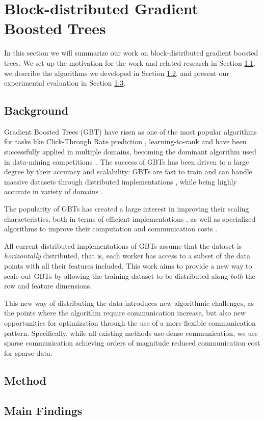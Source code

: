 \section{Block-distributed Gradient Boosted Trees}
\label{sec:block-gbt}

In this section we will summarize our work on block-distributed
gradient boosted trees. We set up the motivation for the work
and related research in Section \ref{sec:block-gbt-background}.
we describe the algorithms we developed in Section \ref{sec:block-gbt-method},
and present our experimental evaluation in Section \ref{sec:block-gbt-results}.

\subsection{Background}
\label{sec:block-gbt-background}

Gradient Boosted Trees (GBT) have risen as one of the most popular algorithms for
tasks like Click-Through Rate prediction \cite{ctr-facebook}, learning-to-rank \cite{mcrank} and have been
successfully applied in multiple domains, becoming the dominant
algorithm used in data-mining competitions~\cite{xgboost}.
The success of GBTs has been driven to a large degree by their
accuracy and scalability: GBTs are fast to train and can handle massive datasets
through distributed implementations \cite{xgboost, lightgbm}, while being
highly accurate in variety of domains \cite{xgboost, hundreds-classifiers}.

The popularity of GBTs has created a large interest
in improving their scaling characteristics,
both in terms of efficient implementations \cite{xgboost, lightgbm, dimboost},
as well as specialized algorithms to improve their computation and communication
costs \cite{comm-efficient-gbt, online-gradient-boosting}.

All current distributed implementations of GBTs assume that the dataset is
\emph{horizontally} distributed, that is, each worker has access to
a subset of the data points with all their features included.
This work aims to provide a new way to scale-out GBTs by allowing the training
dataset to be distributed along \emph{both} the row and feature dimensions.

This new way of distributing the data introduces new algorithmic challenges,
as the points where the algorithm require communication increase, but also new opportunities
for optimization through the use of a more flexible communication pattern.
Specifically, while all existing methods use dense communication,
we use sparse communication achieving orders of magnitude reduced communication
cost for sparse data.

\subsection{Method}
\label{sec:block-gbt-method}




\subsection{Main Findings}
\label{sec:block-gbt-results}
